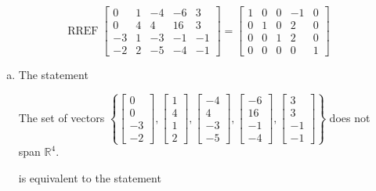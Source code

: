 \begin{exerciseAnswer} 


\[\operatorname{RREF} \left[\begin{array}{ccccc}
0 & 1 & -4 & -6 & 3 \\
0 & 4 & 4 & 16 & 3 \\
-3 & 1 & -3 & -1 & -1 \\
-2 & 2 & -5 & -4 & -1
\end{array}\right] = \left[\begin{array}{ccccc}
1 & 0 & 0 & -1 & 0 \\
0 & 1 & 0 & 2 & 0 \\
0 & 0 & 1 & 2 & 0 \\
0 & 0 & 0 & 0 & 1
\end{array}\right] \]


\begin{enumerate}[(a)]
\item The statement 
\begin{center}\begin{minipage}{0.8\textwidth}
 The set of vectors \( \left\{ \left[\begin{array}{c}
0 \\
0 \\
-3 \\
-2
\end{array}\right] , \left[\begin{array}{c}
1 \\
4 \\
1 \\
2
\end{array}\right] , \left[\begin{array}{c}
-4 \\
4 \\
-3 \\
-5
\end{array}\right] , \left[\begin{array}{c}
-6 \\
16 \\
-1 \\
-4
\end{array}\right] , \left[\begin{array}{c}
3 \\
3 \\
-1 \\
-1
\end{array}\right] \right\} \) does not span \(\mathbb{R}^4\). 
\end{minipage}\end{center}
     is equivalent to the statement 

\end{enumerate}
\end{exerciseAnswer}
